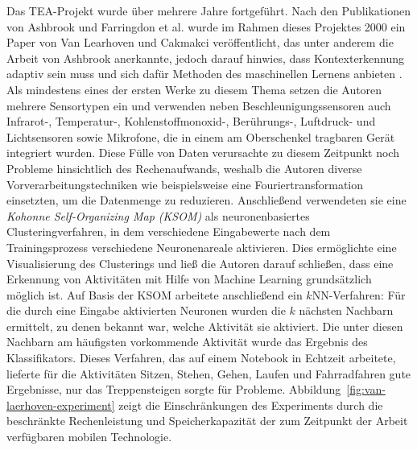 Das TEA-Projekt wurde über mehrere Jahre fortgeführt. Nach den Publikationen von Ashbrook und Farringdon et al. wurde im Rahmen dieses Projektes 2000 ein Paper von Van Learhoven und Cakmakci veröffentlicht, das unter anderem die Arbeit von Ashbrook anerkannte, jedoch darauf hinwies, dass Kontexterkennung adaptiv sein muss und sich dafür Methoden des maschinellen Lernens anbieten \cite{VanLaerhoven2000}. Als mindestens eines der ersten Werke zu diesem Thema setzen die Autoren mehrere Sensortypen ein und verwenden neben Beschleunigungssensoren auch Infrarot-, Temperatur-, Kohlenstoffmonoxid-, Berührungs-, Luftdruck- und Lichtsensoren sowie Mikrofone, die in einem am Oberschenkel tragbaren Gerät integriert wurden. 
Diese Fülle von Daten verursachte zu diesem Zeitpunkt noch Probleme hinsichtlich des Rechenaufwands, weshalb die Autoren diverse Vorverarbeitungstechniken wie beispielsweise eine Fouriertransformation einsetzten, um die Datenmenge zu reduzieren. Anschließend verwendeten sie eine \textit{Kohonne Self-Organizing Map (KSOM)} als neuronenbasiertes Clusteringverfahren, in dem verschiedene Eingabewerte nach dem Trainingsprozess verschiedene Neuronenareale aktivieren. Dies ermöglichte eine Visualisierung des Clusterings und ließ die Autoren darauf schließen, dass eine Erkennung von Aktivitäten mit Hilfe von Machine Learning grundsätzlich möglich ist. Auf Basis der KSOM arbeitete anschließend ein $k$NN-Verfahren: Für die durch eine Eingabe aktivierten Neuronen wurden die $k$ nächsten Nachbarn ermittelt, zu denen bekannt war, welche Aktivität sie aktiviert. Die unter diesen Nachbarn am häufigsten vorkommende Aktivität wurde das Ergebnis des Klassifikators. Dieses Verfahren, das auf einem Notebook in Echtzeit arbeitete, lieferte für die Aktivitäten Sitzen, Stehen, Gehen, Laufen und Fahrradfahren gute Ergebnisse, nur das Treppensteigen sorgte für Probleme. Abbildung~\ref{fig:van-laerhoven-experiment} zeigt die Einschränkungen des Experiments durch die beschränkte Rechenleistung und Speicherkapazität der zum Zeitpunkt der Arbeit verfügbaren mobilen Technologie.

